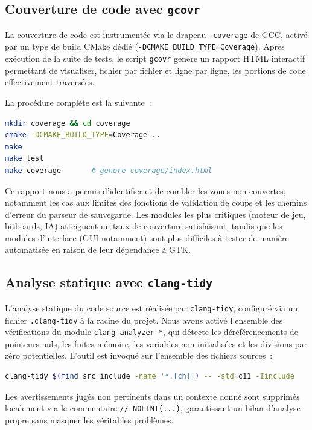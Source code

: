 \documentclass[a4paper]{article}
\begin{document}
\subsection{Couverture de code avec \texttt{gcovr}}
 
La couverture de code est instrumentée via le drapeau \texttt{--coverage}
de GCC, activé par un type de build CMake dédié
(\texttt{-DCMAKE\_BUILD\_TYPE=Coverage}). Après exécution de la suite de
tests, le script \texttt{gcovr} génère un rapport HTML interactif
permettant de visualiser, fichier par fichier et ligne par ligne, les
portions de code effectivement traversées.
 
La procédure complète est la suivante~:
 
\begin{lstlisting}[language=bash, caption=Génération du rapport de couverture]
mkdir coverage && cd coverage
cmake -DCMAKE_BUILD_TYPE=Coverage ..
make
make test
make coverage       # genere coverage/index.html
\end{lstlisting}
 
Ce rapport nous a permis d'identifier et de combler les zones non couvertes,
notamment les cas aux limites des fonctions de validation de coups et les
chemins d'erreur du parseur de sauvegarde. Les modules les plus critiques
(moteur de jeu, bitboards, IA) atteignent un taux de couverture satisfaisant,
tandis que les modules d'interface (GUI notamment) sont plus difficiles à
tester de manière automatisée en raison de leur dépendance à GTK.
 \newpage
\subsection{Analyse statique avec \texttt{clang-tidy}}
 
L'analyse statique du code source est réalisée par \texttt{clang-tidy},
configuré via un fichier \texttt{.clang-tidy} à la racine du projet. Nous
avons activé l'ensemble des vérifications du module
\texttt{clang-analyzer-*}, qui détecte les déréférencements de pointeurs
nuls, les fuites mémoire, les variables non initialisées et les divisions
par zéro potentielles. L'outil est invoqué sur l'ensemble des fichiers
sources~:
 
\begin{lstlisting}[language=bash, caption=Exécution de l'analyse statique]
clang-tidy $(find src include -name '*.[ch]') -- -std=c11 -Iinclude
\end{lstlisting}
 
Les avertissements jugés non pertinents dans un contexte donné sont
supprimés localement via le commentaire \texttt{// NOLINT(...)}, garantissant
un bilan d'analyse propre sans masquer les véritables problèmes.
 
\end{document}
